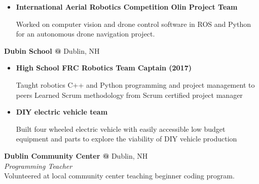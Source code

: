 \documentclass[10pt]{article} %
\begin{document}
\begin{minipage}[t]{0.8\textwidth}
\begin{itemize}
\item {}\textbf{International Aerial Robotics Competition Olin Project Team}

  Worked on computer vision and drone control software in ROS and Python for an autonomous drone navigation project.
  \\
\end{itemize}
  \textbf{Dubin School @} \space Dublin, NH\\
\begin{itemize} [noitemsep,topsep=0pt]
  \item {}\textbf{High School FRC Robotics Team Captain (2017)}

  Taught robotics C++ and Python programming and project management to peers Learned Scrum methodology from Scrum certified project manager
  \item {}\textbf{DIY electric vehicle team }

  Built four wheeled electric vehicle with easily accessible low budget equipment and parts to explore the viability of DIY vehicle production
  \\
\end{itemize}
\textbf{Dublin Community Center @} \space Dublin, NH \\
\textit{Programming Teacher}\\
Volunteered at local community center teaching beginner coding program.
\end{minipage}
\end{document}

